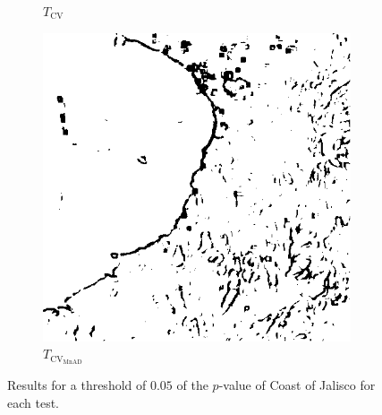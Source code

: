 \begin{figure}[H]
\begin{subfigure}[b]{0.3\textwidth}
    \caption{$T_\text{CV}$}
    \label{fig:Mexico_crops_0.05-2}
  \end{subfigure}
  \hfill
  \begin{subfigure}[b]{0.3\textwidth}
    \centering
    \includegraphics[width=\textwidth]{../../Figures/PNG/mnad_005_mexico_512}
     \caption{$T_{\text{CV}_{\text{MnAD}}}$}
    \label{fig:Mexico_crops_0.05-3}
  \end{subfigure}
  \caption{Results for a threshold of $0.05$ of the $p$-value of Coast of Jalisco for each test. }
  \label{fig:Mexico_crops_0.05}
\end{figure}



